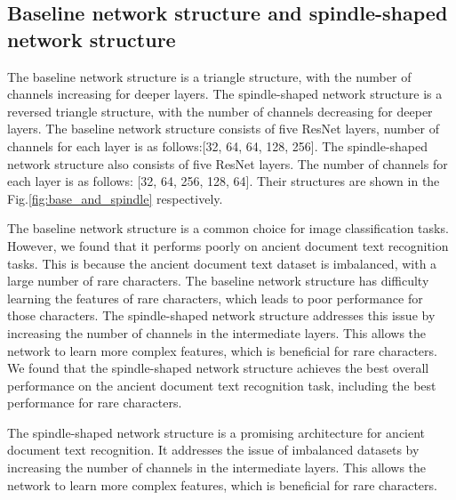 


\subsection{Baseline network structure and spindle-shaped network structure}


The baseline network structure is a triangle structure, with the number of channels increasing for deeper layers. The spindle-shaped network structure is a reversed triangle structure, with the number of channels decreasing for deeper layers. 
The baseline network structure consists of five ResNet layers, number of channels for each layer is as follows:[32, 64, 64, 128, 256].
The spindle-shaped network structure also consists of five ResNet layers. The number of channels for each layer is as follows: [32, 64, 256, 128, 64]. Their structures are shown in the Fig.\ref{fig:base_and_spindle} respectively.

The baseline network structure is a common choice for image classification tasks. However, we found that it performs poorly on ancient document text recognition tasks. This is because the ancient document text dataset is imbalanced, with a large number of rare characters. The baseline network structure has difficulty learning the features of rare characters, which leads to poor performance for those characters. The spindle-shaped network structure addresses this issue by increasing the number of channels in the intermediate layers. This allows the network to learn more complex features, which is beneficial for rare characters. We found that the spindle-shaped network structure achieves the best overall performance on the ancient document text recognition task, including the best performance for rare characters.

The spindle-shaped network structure is a promising architecture for ancient document text recognition. It addresses the issue of imbalanced datasets by increasing the number of channels in the intermediate layers. This allows the network to learn more complex features, which is beneficial for rare characters.
